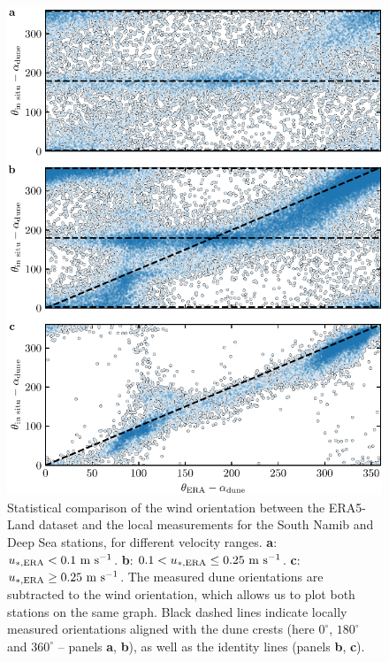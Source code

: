 \begin{figure}[p]
\centering
\includegraphics[scale=1]{Figures/Figure7_supp.pdf}
\caption{Statistical comparison of the wind orientation between the ERA5-Land dataset and the local measurements for the South Namib and Deep Sea stations, for different velocity ranges. \textbf{a}: $u_{*, \textup{\textup{ERA}}} < 0.1~\textup{m}~\textup{s}^{-1}$. \textbf{b}: $0.1 < u_{*, \textup{\textup{ERA}}} \leq 0.25~\textup{m}~\textup{s}^{-1}$. \textbf{c}: $u_{*, \textup{\textup{ERA}}} \geq 0.25~\textup{m}~\textup{s}^{-1}$. The measured dune orientations are subtracted to the wind orientation, which allows us to plot both stations on the same graph. Black dashed lines indicate locally measured orientations aligned with the dune crests (here $0^\circ$, $180^\circ$ and $360^\circ$ -- panels \textbf{a}, \textbf{b}), as well as the identity lines (panels \textbf{b}, \textbf{c}).}
\label{Fig7_supp}
\end{figure}

